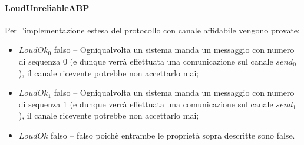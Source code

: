 \paragraph{LoudUnreliableABP} \mbox{}

Per l'implementazione estesa del protocollo con canale affidabile vengono
provate:

\begin{itemize}
  \item $LoudOk_0$ falso -- Ogniqualvolta un sistema manda un messaggio con
    numero di sequenza 0 (e dunque verrà effettuata una comunicazione sul
    canale $send_0$), il canale ricevente potrebbe non accettarlo mai;
  \item $LoudOk_1$ falso -- Ogniqualvolta un sistema manda un messaggio con
    numero di sequenza 1 (e dunque verrà effettuata una comunicazione sul
    canale $send_1$), il canale ricevente potrebbe non accettarlo mai;
  \item $LoudOk$ falso -- falso poichè entrambe le proprietà sopra descritte
    sono false.
\end{itemize}
